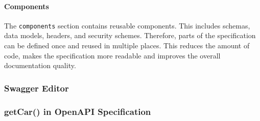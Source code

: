 \paragraph*{Components}
The \texttt{components} section contains reusable components.
This includes schemas, data models, headers, and security schemes.
Therefore, parts of the specification can be defined once and reused in multiple places.
This reduces the amount of code, makes the specification more readable and improves the overall documentation quality.

\subsubsection*{Swagger Editor}


\subsubsection*{getCar() in OpenAPI Specification}